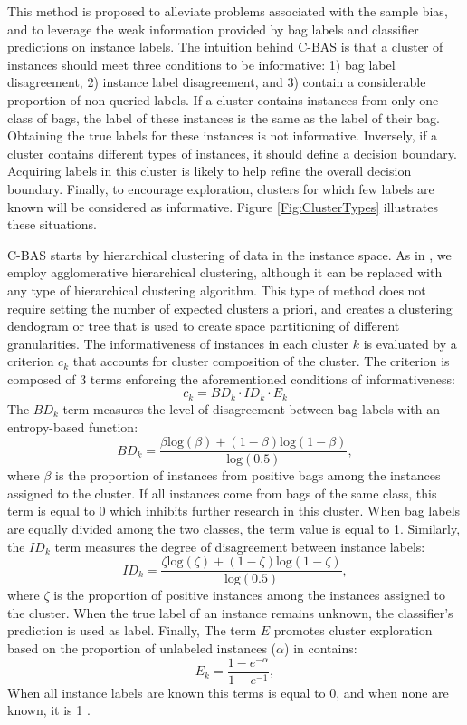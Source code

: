 \documentclass{article}
\begin{document}
This method is proposed to alleviate problems associated with the sample bias, and to leverage the weak information provided by bag labels and classifier predictions on instance labels. The intuition behind C-BAS is that a cluster of instances should meet three conditions to be informative: 1) bag label disagreement, 2) instance label disagreement, and 3) contain a considerable proportion of non-queried labels. If a cluster contains instances from only one class of bags, the label of these instances is the same as the label of their bag. Obtaining the true labels for these instances is not informative. Inversely, if a cluster contains different types of instances, it should define a decision boundary. Acquiring labels in this cluster is likely to help refine the overall decision boundary. Finally, to encourage exploration, clusters for which few labels are known will be considered as informative. Figure \ref{Fig:ClusterTypes} illustrates these situations.  

C-BAS starts by hierarchical clustering of data in the instance space. As in \cite{Dasgupta2008}, we employ agglomerative hierarchical clustering, although it can be replaced with any type of hierarchical clustering algorithm. This type of method does not require setting the number of expected clusters a priori, and creates a clustering dendogram or tree that is used to create space partitioning of different granularities. The informativeness of instances in each cluster $k$ is evaluated by a criterion $c_k$ that accounts for cluster composition of the cluster. The criterion is composed of 3 terms enforcing the aforementioned conditions of informativeness:
\begin{equation}
c_k = BD_k \cdot ID_k \cdot E_k 
\end{equation} 
The $BD_k$ term measures the level of disagreement between bag labels with an entropy-based function:
\begin{equation}
BD_k = \frac{\beta \textrm{log}(\beta) +  (1-\beta)\textrm{log}(1-\beta)}{\textrm{log}(0.5)},
\end{equation} 
where $\beta$ is the proportion of instances from positive bags among the instances assigned to the cluster. If all instances come from bags of the same class, this term is equal to 0 which inhibits further research in this cluster. When bag labels are equally divided among the two classes, the term value is equal to 1.  Similarly, the $ID_k$ term measures the degree of disagreement between instance labels:
\begin{equation}
ID_k = \frac{\zeta \textrm{log}(\zeta) +  (1-\zeta)\textrm{log}(1-\zeta)}{\textrm{log}(0.5)},
\end{equation}
where $\zeta$ is the proportion of positive instances among the instances assigned to the cluster. When the true label of an instance remains unknown, the classifier's prediction is used as label. Finally, The term $E$ promotes cluster exploration based on the proportion of unlabeled instances ($\alpha$) in contains:
\begin{equation}
E_k = \frac{1-e^{-\alpha}}{1-e^{-1}},
\end{equation}
When all instance labels are known this terms is equal to 0, and when none are known, it is 1 .
\end{document}
